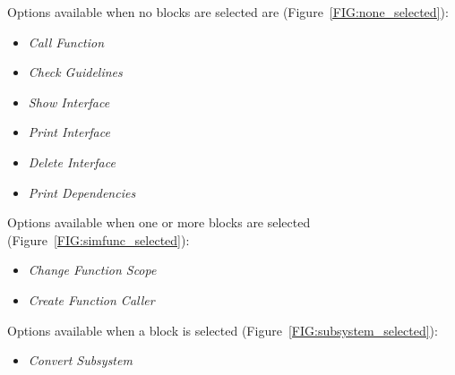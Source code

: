 \documentclass{article}
\newcommand{\menu}[1]{%
	\ifstrequal{#1}{1}{Call Function}{}%
  \ifstrequal{#1}{2}{Create Function Caller}{}%
	\ifstrequal{#1}{3}{Change Function Scope}{}%
	\ifstrequal{#1}{4}{Check Guidelines}{}%
	\ifstrequal{#1}{5}{Show Interface}{}%
	\ifstrequal{#1}{6}{Print Interface}{}%
	\ifstrequal{#1}{7}{Print Dependencies}{}%
	\ifstrequal{#1}{8}{Delete Interface}{}%
	\ifstrequal{#1}{9}{Convert Subsystem}{}%
}
\begin{document}
\noindent
Options available when no blocks are selected are (Figure~\ref{FIG:none_selected}):
\begin{itemize}
	\item \emph{\menu{1}} %
	\item \emph{\menu{4}}
	\item \emph{\menu{5}} %
	\item \emph{\menu{6}} %
	\item \emph{\menu{8}} %
	\item \emph{\menu{7}} 
\end{itemize}

\noindent
Options available when one or more \simfunc blocks are selected (Figure~\ref{FIG:simfunc_selected}):
\begin{itemize}
	\item \emph{\menu{3}} %
	\item \emph{\menu{2}} %
\end{itemize}

\noindent
Options available when a \subsystem block is selected (Figure~\ref{FIG:subsystem_selected}):
\begin{itemize}
	\item \emph{\menu{9}} %
\end{itemize}
\end{document}
